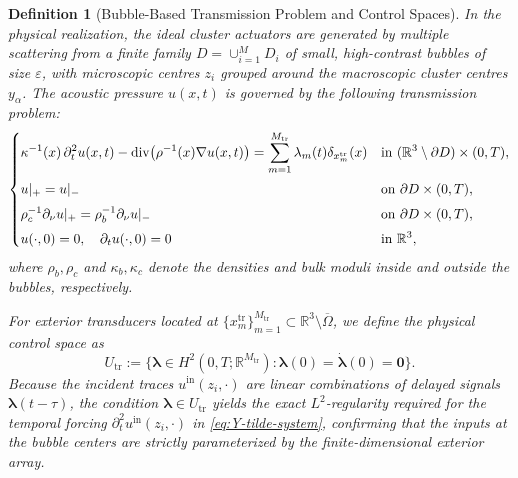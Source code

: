 \documentclass[11pt,a4paper]{article}
\numberwithin{equation}{section}
\newtheorem{definition}{Definition}
\newcommand{\R}{\mathbb{R}}
\DeclareMathOperator{\Div}{div}
\begin{document}
\begin{definition}[Bubble-Based Transmission Problem and Control Spaces]
In the physical realization, the ideal cluster actuators are generated by multiple scattering from a finite family $D = \cup_{i=1}^M D_i$ of small, high-contrast bubbles of size $\varepsilon$, with microscopic centres $z_i$ grouped around the macroscopic cluster centres $y_\alpha$. The acoustic pressure $u(x,t)$ is governed by the following transmission problem:
\begin{equation}
\label{eq:MS-physical}
\left\{
\begin{aligned}
 &\kappa^{-1}(x)\,\partial_t^2 u(x,t)-\Div\bigl(\rho^{-1}(x)\nabla u(x,t)\bigr)
   =\sum_{m=1}^{M_{\rm tr}} \lambda_m(t)\delta_{x_m^{\mathrm{tr}}}(x)
   &&\text{in }(\R^3\setminus\partial D)\times(0,T),\\[0.2em]
 &u|_+ = u|_- &&\text{on }\partial D\times(0,T),\\[0.2em]
 &\rho_c^{-1}\partial_\nu u|_+ = \rho_b^{-1}\partial_\nu u|_- &&\text{on }\partial D\times(0,T),\\[0.2em]
 &u(\cdot,0)=0,\quad \partial_t u(\cdot,0)=0 &&\text{in }\R^3,
\end{aligned}
\right.
\end{equation}
where $\rho_b, \rho_c$ and $\kappa_b, \kappa_c$ denote the densities and bulk moduli inside and outside the bubbles, respectively. 
\medskip

\noindent
For exterior transducers located at $\{x_m^{\mathrm{tr}}\}_{m=1}^{M_{\mathrm{tr}}} \subset \mathbb{R}^3 \setminus \overline{\Omega}$, we define the physical control space as
\begin{equation}
\label{eq:Utr-definition}
    U_{\mathrm{tr}} := \bigl\{ \boldsymbol{\lambda} \in H^2(0,T; \mathbb{R}^{M_{\mathrm{tr}}}) : \boldsymbol{\lambda}(0) = \dot{\boldsymbol{\lambda}}(0) = \mathbf{0} \bigr\}.
\end{equation}
Because the incident traces $u^{\mathrm{in}}(z_i, \cdot)$ are linear combinations of delayed signals $\boldsymbol{\lambda}(t-\tau)$, the condition $\boldsymbol{\lambda} \in U_{\mathrm{tr}}$ yields the exact $L^2$-regularity required for the temporal forcing $\partial_t^2 u^{\mathrm{in}}(z_i, \cdot)$ in \eqref{eq:Y-tilde-system}, confirming that the inputs at the bubble centers are strictly parameterized by the finite-dimensional exterior array.

\end{definition}
\end{document}
